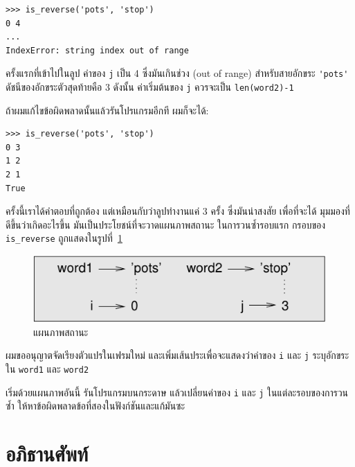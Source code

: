 \begin{verbatim}
>>> is_reverse('pots', 'stop')
0 4
...
IndexError: string index out of range
\end{verbatim}
%
ครั้งแรกที่เข้าไปในลูป ค่าของ {\tt j} เป็น 4 ซึ่งมันเกินช่วง (out of range)
สำหรับสายอักขระ \verb"'pots'" ดัชนีของอักขระตัวสุดท้ายคือ 3 ดังนั้น 
ค่าเริ่มต้นของ {\tt j} ควรจะเป็น {\tt len(word2)-1}

ถ้าผมแก้ไขข้อผิดพลาดนั้นแล้วรันโปรแกรมอีกที ผมก็จะได้:

\begin{verbatim}
>>> is_reverse('pots', 'stop')
0 3
1 2
2 1
True
\end{verbatim}
%
ครั้งนี้เราได้คำตอบที่ถูกต้อง แต่เหมือนกับว่าลูปทำงานแค่ 3 ครั้ง ซึ่งมันน่าสงสัย เพื่อที่จะได้
มุมมองที่ดีขึ้นว่าเกิดอะไรขึ้น มันเป็นประโยชน์ที่จะวาดแผนภาพสถานะ  ในการวนซ้ำรอบแรก
กรอบของ \verb"is_reverse" ถูกแสดงในรูปที่~\ref{fig.state4}

 
 

\begin{figure}
\centerline
{\includegraphics[scale=0.8]{figs/state4.pdf}}
\caption{แผนภาพสถานะ}
\label{fig.state4}
\end{figure}

ผมขออนุญาตจัดเรียงตัวแปรในเฟรมใหม่ และเพิ่มเส้นประเพื่อจะแสดงว่าค่าของ {\tt i} และ
{\tt j} ระบุอักขระใน {\tt word1} และ {\tt word2}

เริ่มด้วยแผนภาพอันนี้ รันโปรแกรมบนกระดาษ แล้วเปลี่ยนค่าของ {\tt i} และ {\tt j}
ในแต่ละรอบของการวนซ้ำ ให้หาข้อผิดพลาดข้อที่สองในฟังก์ชันและแก้มันซะ
\label{isreverse}


\section{อภิธานศัพท์}

